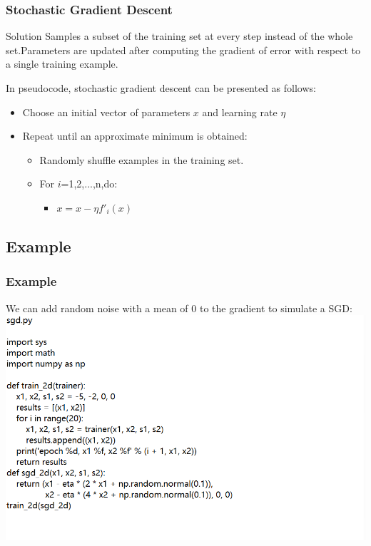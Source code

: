 \documentclass[cjk]{beamer}
\begin{document}
\begin{CJK*}{GBK}{kai}
\begin{frame}
\frametitle{Stochastic Gradient Descent}
\begin{block}{Solution}
Samples a subset of the training set at every step instead of the whole set.Parameters are updated after computing the gradient of error with respect to a single training example.
\end{block}
In pseudocode, stochastic gradient descent can be presented as follows:\\
\begin{itemize}
\item Choose an initial vector of parameters $x$ and learning rate $\eta$
\item Repeat until an approximate minimum is obtained:
\begin{itemize}
\item Randomly shuffle examples in the training set.
\item For $i$=1,2,...,n,do:
\begin{itemize}
\item $x=x-\eta f'_i(x)$
\end{itemize}
\end{itemize}
\end{itemize}
\end{frame}

\subsection{Example}

\begin{frame}
\frametitle{Example}
We can add random noise with a mean of 0 to the gradient to simulate a SGD:
\includegraphics[width= \textwidth]{sgd1.png}
\end{frame}


\end{CJK*}
\end{document}
